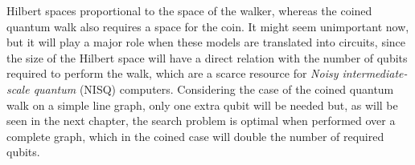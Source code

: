 \documentclass[../../dissertation.tex]{subfiles}
\begin{document}
Hilbert spaces proportional to the space of the walker, whereas the coined
quantum walk also requires a space for the coin. It might seem unimportant now,
but it will play a major role when these models are translated into circuits,
since the size of the Hilbert space will have a direct relation with the number
of qubits required to perform the walk, which are a scarce resource for
\textit{Noisy intermediate-scale quantum} (NISQ) computers. Considering the
case of the coined quantum walk on a simple line graph, only one extra qubit
will be needed but, as will be seen in the next chapter, the search problem is
optimal when performed over a complete graph, which in the coined case will
double the number of required qubits. 
\end{document}
